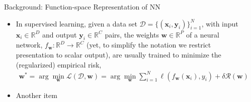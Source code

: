 \documentclass[final,12pt]{beamer}
\newcommand{\mbf}[1]{\mathbf{#1}}
\newcommand{\dataset}{\ensuremath{\mathcal{D}}}
\newcommand{\inputDomain}{\ensuremath{\mathbb{R}^{D}}}
\newcommand{\outputDomain}{\ensuremath{\mathbb{R}^{C}}}
\newcommand{\weights}{\ensuremath{\mathbf{w}}}
\newcommand{\vx}{\mbf{x}}
\newcommand{\vy}{\mbf{y}}
\newcommand{\R}{\mathbb{R}}
\newlength{\sepwidth}
\newlength{\colwidth}
\newcommand{\separatorcolumn}{\begin{column}{\sepwidth}\end{column}}
\begin{document}
\begin{frame}[t]
\begin{columns}[t]
\begin{column}{\colwidth}
  \begin{block}{Background: Function-space Representation of NN}

  \begin{itemize}
    \item In supervised learning, given a data set $\dataset = \{(\vx_{i} , \vy_{i})\}_{i=1}^{N}$, with input $\vx_i \in \inputDomain$ and output $\vy_i \in \outputDomain$ pairs, the weights $\weights \in \R^{P}$ of a neural network, $f_\mathbf{w}: \inputDomain \to \outputDomain$ (yet, to simplify the notation we restrict presentation to scalar output), are usually trained to minimize the (regularized) empirical risk,
\begin{align} 
  \weights^{*} =  \arg \min_{\weights} \mathcal{L}(\dataset,\weights) \nonumber
     = \arg \min_{\weights} \textstyle\sum_{i=1}^{N} \ell(f_\weights(\mathbf{x}_{i}), y_i) + \delta \mathcal{R}(\weights).
 \end{align}

     \item Another item
  \end{itemize}

  \end{block}
\end{column}

\separatorcolumn


\end{columns}
\end{frame}
\end{document}
